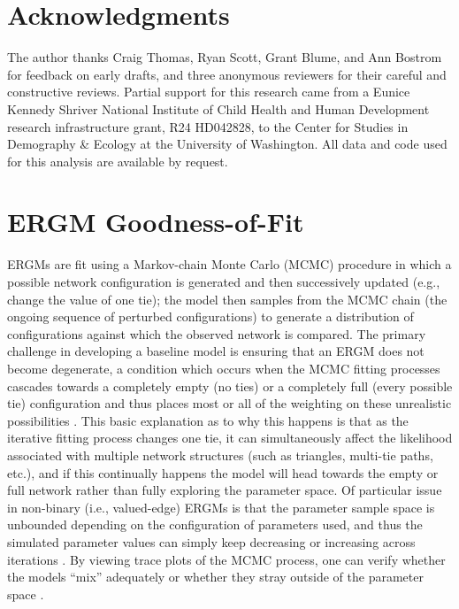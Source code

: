\documentclass[12pt,a4paper,titlepage]{article}
\begin{document}
\section*{Acknowledgments}

The author thanks Craig Thomas, Ryan Scott, Grant Blume, and Ann Bostrom for feedback on early drafts, and three anonymous reviewers for their careful and constructive reviews. Partial support for this research came from a Eunice Kennedy Shriver National Institute of Child Health and Human Development research infrastructure grant, R24 HD042828, to the Center for Studies in Demography \& Ecology at the University of Washington. All data and code used for this analysis are available by request. 

\nocite{handcock2014-a,analytics2014,butts2014}

\printbibliography



\appendix
{}
\section{ERGM Goodness-of-Fit}
\label{appendix:gof}


ERGMs are fit using a Markov-chain Monte Carlo (MCMC) procedure in which a possible network configuration is generated and then successively updated (e.g., change the value of one tie); the model then samples from the MCMC chain (the ongoing sequence of perturbed configurations) to generate a distribution of configurations against which the observed network is compared. The primary challenge in developing a baseline model is ensuring that an ERGM does not become degenerate, a condition which occurs when the MCMC fitting processes cascades towards a completely empty (no ties) or a completely full (every possible tie) configuration and thus places most or all of the weighting on these unrealistic possibilities \parencite{handcock2003, kolaczyk2009}. This basic explanation as to why this happens is that as the iterative fitting process changes one tie, it can simultaneously affect the likelihood associated with multiple network structures (such as triangles, multi-tie paths, etc.), and if this continually happens the model will head towards the empty or full network rather than fully exploring the parameter space. Of particular issue in non-binary (i.e., valued-edge) ERGMs is that the parameter sample space is unbounded depending on the configuration of parameters used, and thus the simulated parameter values can simply keep decreasing or increasing across iterations \parencite{krivitsky2013}. By viewing trace plots of the MCMC process, one can verify whether the models “mix” adequately or whether they stray outside of the parameter space \parencite{krivitsky2012}.
\end{document}
